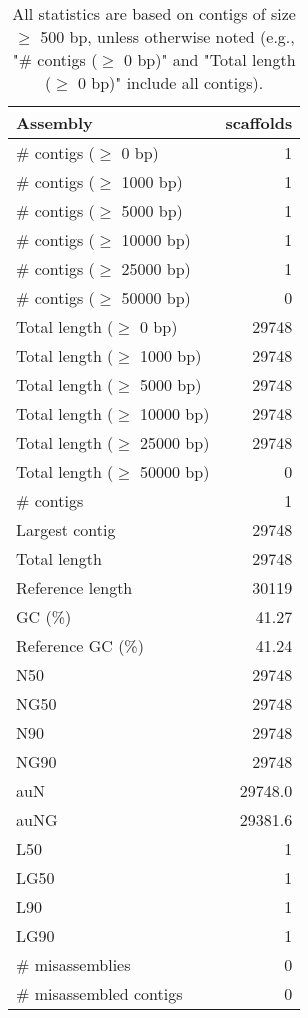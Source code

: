 \documentclass[12pt,a4paper]{article}
\begin{document}
\begin{table}[ht]
\begin{center}
\caption{All statistics are based on contigs of size $\geq$ 500 bp, unless otherwise noted (e.g., "\# contigs ($\geq$ 0 bp)" and "Total length ($\geq$ 0 bp)" include all contigs).}
\begin{tabular}{|l*{1}{|r}|}
\hline
Assembly & scaffolds \\ \hline
\# contigs ($\geq$ 0 bp) & 1 \\ \hline
\# contigs ($\geq$ 1000 bp) & 1 \\ \hline
\# contigs ($\geq$ 5000 bp) & 1 \\ \hline
\# contigs ($\geq$ 10000 bp) & 1 \\ \hline
\# contigs ($\geq$ 25000 bp) & 1 \\ \hline
\# contigs ($\geq$ 50000 bp) & 0 \\ \hline
Total length ($\geq$ 0 bp) & 29748 \\ \hline
Total length ($\geq$ 1000 bp) & 29748 \\ \hline
Total length ($\geq$ 5000 bp) & 29748 \\ \hline
Total length ($\geq$ 10000 bp) & 29748 \\ \hline
Total length ($\geq$ 25000 bp) & 29748 \\ \hline
Total length ($\geq$ 50000 bp) & 0 \\ \hline
\# contigs & 1 \\ \hline
Largest contig & 29748 \\ \hline
Total length & 29748 \\ \hline
Reference length & 30119 \\ \hline
GC (\%) & 41.27 \\ \hline
Reference GC (\%) & 41.24 \\ \hline
N50 & 29748 \\ \hline
NG50 & 29748 \\ \hline
N90 & 29748 \\ \hline
NG90 & 29748 \\ \hline
auN & 29748.0 \\ \hline
auNG & 29381.6 \\ \hline
L50 & 1 \\ \hline
LG50 & 1 \\ \hline
L90 & 1 \\ \hline
LG90 & 1 \\ \hline
\# misassemblies & 0 \\ \hline
\# misassembled contigs & 0 \\ \hline

\end{tabular}
\end{center}
\end{table}
\end{document}
